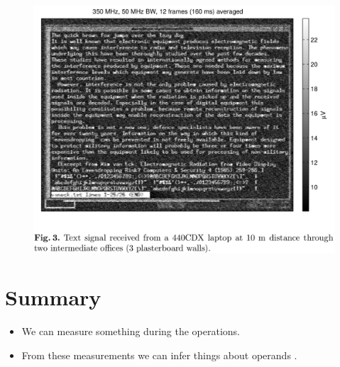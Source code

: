 \begin{frame}
  \begin{figure}
    \includegraphics[height=0.9\textheight]{em-laptop.png}
  \end{figure}
\end{frame}

\section{Summary}

\begin{frame}
  \begin{itemize}
    \item We can measure something during the operations.
    \item From these measurements we can infer things about operands \etc.
  \end{itemize}
\end{frame}




\begin{frame}[allowframebreaks]
  \small
  \printbibliography{}
\end{frame}

